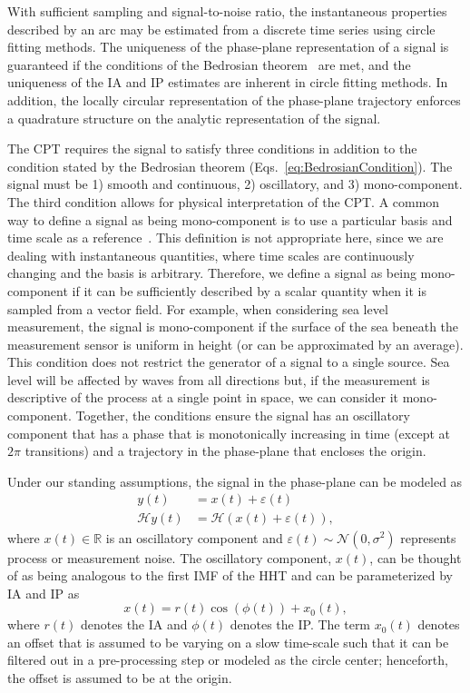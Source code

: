 \documentclass[journal,11pt,a4paper,onecolumn,draftcls]{IEEEtran}
\begin{document}
With sufficient sampling and signal-to-noise ratio, the instantaneous properties described by an arc may be estimated from a discrete time series using circle fitting methods. The uniqueness of the phase-plane representation of a signal is guaranteed if the conditions of the Bedrosian theorem~\cite{Bedrosian1963} are met, and the uniqueness of the IA and IP estimates are inherent in circle fitting methods. In addition, the locally circular representation of the phase-plane trajectory enforces a quadrature structure on the analytic representation of the signal.

The CPT requires the signal to satisfy three conditions in addition to the condition stated by the Bedrosian theorem (Eqs.~\ref{eq:BedrosianCondition}). The signal must be 1) smooth and continuous, 2) oscillatory, and 3) mono-component. The third condition allows for physical interpretation of the CPT. A common way to define a signal as being mono-component is to use a particular basis and time scale as a reference~\cite{Boashash1992,Cohen1995}. This definition is not appropriate here, since we are dealing with instantaneous quantities, where time scales are continuously changing and the basis is arbitrary. Therefore, we define a signal as being mono-component if it can be sufficiently described by a scalar quantity when it is sampled from a vector field. For example, when considering sea level measurement, the signal is mono-component if the surface of the sea beneath the measurement sensor is uniform in height (or can be approximated by an average). This condition does not restrict the generator of a signal to a single source. Sea level will be affected by waves from all directions but, if the measurement is descriptive of the process at a single point in space, we can consider it mono-component. Together, the conditions ensure the signal has an oscillatory component that has a phase that is monotonically increasing in time (except at $2\pi$ transitions) and a trajectory in the phase-plane that encloses the origin. 

Under our standing assumptions, the signal in the phase-plane can be modeled as
\begin{align}\label{eq:SignalModel}
y\left( t \right) &= x\left( t \right) + \varepsilon \left( t \right) \\
\mathcal{H}y\left( t \right) &= \mathcal{H}(x\left( t \right) + \varepsilon \left( t \right)),
\end{align}
where $x(t) \in \mathbb{R}$ is an oscillatory component and $\varepsilon(t) \sim \mathcal{N}(0,\sigma^2)$ represents process or measurement noise. The oscillatory component, $x(t)$, can be thought of as being analogous to the first IMF of the HHT and can be parameterized by IA and IP as
\begin{equation}\label{eq:InstAmplitudeAndPhase}
    x\left( t \right) = r\left( t \right)\cos \left( {\phi \left( t \right)} \right) + x_0(t),
\end{equation}
where $r(t)$ denotes the IA and $\phi(t)$ denotes the IP. The term $x_0(t)$ denotes an offset that is assumed to be varying on a slow time-scale such that it can be filtered out in a pre-processing step or modeled as the circle center; henceforth, the offset is assumed to be at the origin. 
\end{document}
